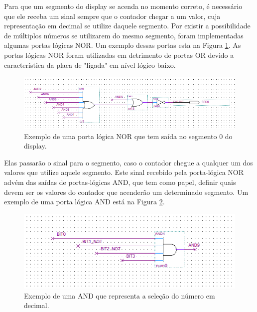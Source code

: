 Para que um segmento do display se acenda no momento correto, é necessário que ele receba um sinal sempre que o contador chegar a um valor, cuja representação em decimal se utilize daquele segmento. Por existir a possibilidade de múltiplos números se utilizarem do mesmo segmento, foram implementadas algumas portas lógicas NOR. Um exemplo dessas portas esta na Figura \ref{fig:2.22}. As portas lógicas NOR foram utilizadas em detrimento de portas OR devido a característica da placa de "ligada" em nível lógico baixo.

\begin{figure}[H]
	\centering
	\includegraphics[width=1\columnwidth]{FIGURAS/cap_2/ExemploNOR.png}
	\caption{Exemplo de uma porta lógica NOR que tem saída no segmento 0 do display.}
        \label{fig:2.22}
\end{figure}


Elas passarão o sinal para o segmento, caso o contador chegue a qualquer um dos valores que utilize aquele segmento. Este sinal recebido pela porta-lógica NOR advém das saídas de portas-lógicas AND, que tem como papel, definir quais devem ser os valores do contador que acenderão um determinado segmento. Um exemplo de uma porta lógica AND está na Figura \ref{fig:2.23}.

\begin{figure}[H]
	\centering
	\includegraphics[width=1\columnwidth]{FIGURAS/cap_2/ExemploAND.png}
	\caption{Exemplo de uma AND que representa a seleção do número em decimal.}
        \label{fig:2.23}
\end{figure}